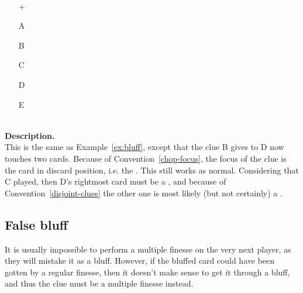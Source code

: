 \begin{example}	\hfill \\
	\begin{minipage}{0.45\textwidth}
		\begin{itemize}
			\item[\Large +]      
			\item[\Large A]    
			\item[\Large B]    
			\item[\Large C]    
			\item[\Large D]    
			\item[\Large E]    
		\end{itemize}
	\end{minipage}%
	\begin{minipage}{0.55\textwidth}
		\hfill \\
		
		\textbf{Description.} \\
		
		This is the same as Example~\ref{ex:bluff}, except that the  clue B gives to D now touches two cards. Because of Convention~\ref{chop-focus}, the focus of the clue is the card in discard position, i.e. the . This still works as normal. Considering that C played, then D's rightmost card must be a , and because of Convention~\ref{disjoint-clues} the other one is most likely (but not certainly) a .
	\end{minipage}
\end{example} \vspace{0.15 cm}

\subsection{False bluff}

It is usually impossible to perform a multiple finesse on the very next player, as they will mistake it as a bluff. However, if the bluffed card could have been gotten by a regular finesse, then it doesn't make sense to get it through a bluff, and thus the clue must be a multiple finesse instead.

